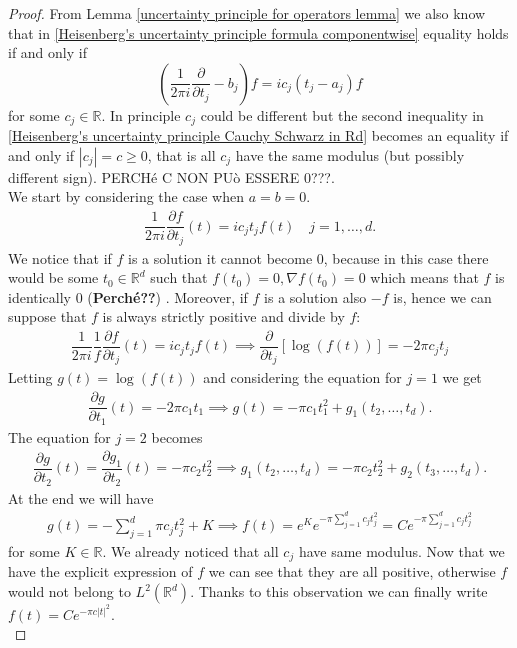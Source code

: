 \documentclass[corpo=11pt, stile=classica, tipotesi=custom,
greek, evenboxes, english]{toptesi}
\numberwithin{equation}{chapter}
\theoremstyle{remark}
\newcommand{\R}{\mathbb{R}} %
\newcommand{\pdfrac}[2]{\dfrac{\partial #1}{\partial #2}}
\begin{document}
\begin{proof}
	{\color{red} From Lemma \ref{uncertainty principle for operators lemma} we also know that in \eqref{Heisenberg's uncertainty principle formula componentwise} equality holds if and only if
	\begin{equation}\label{Heisenberg's uncertainty principle differential equation}
		\left(\dfrac{1}{2\pi i}\pdfrac{}{t_j} - b_j\right)f = ic_j (t_j-a_j)f
	\end{equation}
	for some $c_j \in \R$. In principle $c_j$ could be different but the second inequality in \eqref{Heisenberg's uncertainty principle Cauchy Schwarz in Rd} becomes an equality if and only if $|c_j|=c \geq 0$, that is all $c_j$ have the same modulus (but possibly different sign). 	PERCHé C NON PUò ESSERE 0???.\\
	We start by considering the case when $a=b=0$.
	\begin{align}\label{Heisenberg's uncertainty principle differential equation centered}
		\dfrac{1}{2\pi i}\pdfrac{f}{t_j}(t) = ic_j t_j f(t) \quad j=1,\ldots,d.
	\end{align}
	We notice that if $f$ is a solution it cannot become 0, because in this case there would be some $t_0 \in \R^d$ such that $f(t_0)=0, \nabla f(t_0)=0$ which means that $f$ is identically 0 (\textbf{Perché??}) . Moreover, if $f$ is a solution also $-f$ is, hence we can suppose that $f$ is always strictly positive and divide by $f$:
	\begin{align*}
		\dfrac{1}{2\pi i} \dfrac{1}{f} \pdfrac{f}{t_j}(t) = ic_j t_j f(t) \implies \pdfrac{}{t_j}\left[\log(f(t))\right] = -2\pi c_j t_j
	\end{align*}
	Letting $g(t)=\log(f(t))$ and considering the equation for $j=1$ we get
	\begin{align*}
		\pdfrac{g}{t_1}(t) = -2\pi c_1 t_1 \implies g(t) = - \pi c_1 t_1^2 + g_1(t_2,\ldots,t_d).
	\end{align*}
	The equation for $j=2$ becomes
	\begin{align*}
		\pdfrac{g}{t_2}(t) = \pdfrac{g_1}{t_2}(t) = -\pi c_2 t_2^2 \implies g_1(t_2,\ldots,t_d) = -\pi c_2 t_2^2 + g_2(t_3,\ldots,t_d).
	\end{align*}
	At the end we will have
	\begin{align*}
		g(t) = -\sum_{j=1}^{d}\pi c_j t_j^2 + K \implies f(t) = e^K e^{-\pi \sum_{j=1}^{d} c_j t_j^2} = C e^{-\pi \sum_{j=1}^{d} c_j t_j^2}
	\end{align*}
	for some $K \in \R$. We already noticed that all $c_j$ have same modulus. Now that we have the explicit expression of $f$ we can see that they are all positive, otherwise $f$ would not belong to $L^2(\R^d)$. Thanks to this observation we can finally write $f(t) = C e^{-\pi c |t|^2}$.\\
}
\end{proof}
\end{document}
